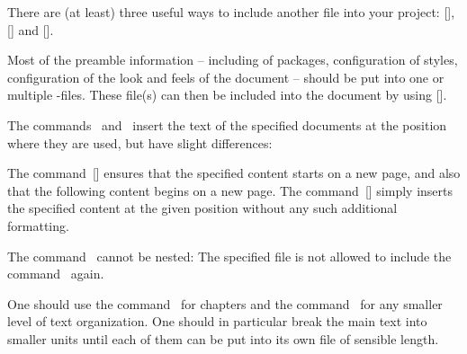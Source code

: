 There are (at least) three useful ways to include another file into your project: [\comname], [\comname] and [\comname].
\begin{myitemize}
  \item
    Most of the preamble information -- including of packages, configuration of styles, configuration of the look and feels of the document -- should be put into one or multiple -files.
    These file(s) can then be included into the document by using [\comname].
  \item
    The commands~ and~ insert the text of the specified documents at the position where they are used, but have slight differences:
    \begin{myitemize}
      \item
        The command~[\comname] ensures that the specified content starts on a new page, and also that the following content begins on a new page.
        The command~[\comname] simply inserts the specified content at the given position without any such additional formatting.
      \item
        The command~ cannot be nested:
        The specified file is not allowed to include the command~ again.
    \end{myitemize}
\end{myitemize}

One should use the command~ for chapters and the command~ for any smaller level of text organization.
One should in particular break the main text into smaller units until each of them can be put into its own file of sensible length.

